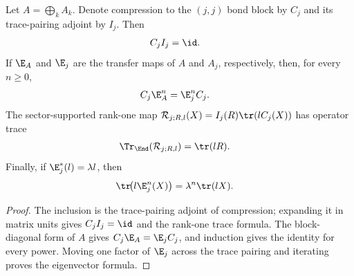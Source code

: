 \begin{lemma}%
    \label{lem:zcl_direct_sum_sector_calculus}
    \leanok
    Let $A=\bigoplus_k A_k$. Denote compression to the $(j,j)$ bond block by
    $C_j$ and its trace-pairing adjoint by $I_j$. Then
    \begin{align}
        C_jI_j & =\id.
        \notag
    \end{align}
    If $\E_A$ and $\E_j$ are the transfer maps of $A$ and $A_j$, respectively,
    then, for every $n\geq0$,
    \begin{align}
        C_j\E_A^n & =\E_j^nC_j.
        \notag
    \end{align}
    The sector-supported rank-one map
    $\mathcal R_{j;R,l}(X)=I_j(R)\tr(lC_j(X))$ has operator trace
    \begin{align}
        \Tr_{\End}(\mathcal R_{j;R,l}) & =\tr(lR).
        \notag
    \end{align}
    Finally, if $\E_j^*(l)=\lambda l$, then
    \begin{align}
        \tr\!\bigl(l\E_j^n(X)\bigr) & =\lambda^n\tr(lX).
        \notag
    \end{align}
\end{lemma}
\begin{proof}\leanok
    The inclusion is the trace-pairing adjoint of compression; expanding it in
    matrix units gives $C_jI_j=\id$ and the rank-one trace formula. The
    block-diagonal form of $A$ gives $C_j\E_A=\E_jC_j$, and induction gives the
    identity for every power. Moving one factor of $\E_j$ across the trace
    pairing and iterating proves the eigenvector formula.
\end{proof}

